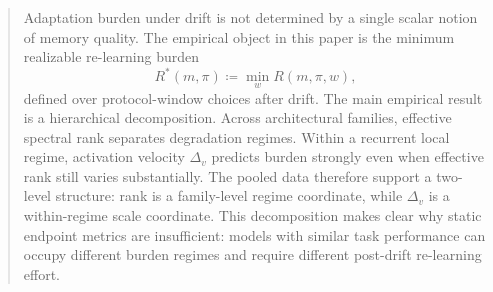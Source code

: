 \begin{abstract}
Adaptation burden under drift is not determined by a single scalar notion of
memory quality. The empirical object in this paper is the minimum realizable
re-learning burden
\[
  R^*(m,\pi) \coloneqq \min_w R(m,\pi,w),
\]
defined over protocol-window choices after drift. The main empirical result is a
hierarchical decomposition. Across architectural families, effective spectral
rank separates degradation regimes. Within a recurrent local regime, activation
velocity $\Delta_v$ predicts burden strongly even when effective rank still
varies substantially. The pooled data therefore support a two-level structure:
rank is a family-level regime coordinate, while $\Delta_v$ is a within-regime
scale coordinate. This decomposition makes clear why static endpoint metrics are
insufficient: models with similar task performance can occupy different burden
regimes and require different post-drift re-learning effort.
\end{abstract}
